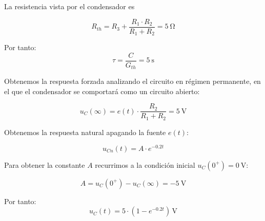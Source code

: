 \begin{enumerate}
  \begin{minipage}{0.5\linewidth}
    La resistencia vista por el condensador es

  \[
    R_{th} = R_3 + \frac{R_1 \cdot R_2}{R_1 + R_2} = \qty{5}{\ohm}
  \]

  Por tanto:
  \begin{equation*}
    \tau = \frac{C}{G_{th}} = \qty{5}{\second}
  \end{equation*}
\end{minipage}
\begin{minipage}{0.5\linewidth}
\end{minipage}

Obtenemos la respuesta forzada analizando el circuito en régimen
permanente, en el que el condensador se comportará como un circuito
abierto:

\begin{equation*}
  u_{C}(\infty) = e(t) \cdot \frac{R_2}{R_1 + R_2} = \qty{5}{\volt}
\end{equation*}

Obtenemos la respuesta natural apagando la fuente $e(t)$:

\begin{equation*}
  u_{Cn}(t) = A \cdot e^{-0.2t}
\end{equation*}

Para obtener la constante $A$ recurrimos a la condición inicial
$u_C(0^+) = \qty{0}{\volt}$:

\begin{equation*}
  A = u_C(0^+) - u_C(\infty) = \qty{-5}{\volt}
\end{equation*}

Por tanto:
\begin{equation*}
  u_C(t) = 5 \cdot (1 - e^{-0.2t}) \,\unit{\volt}
\end{equation*}


\end{enumerate}
